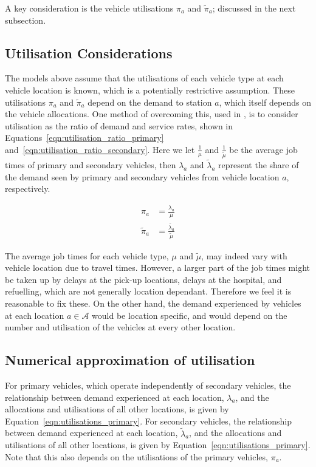 \documentclass[preprint,12pt]{elsarticle}
\begin{document}
A key consideration is the vehicle utilisations $\pi_a$ and $\tilde{\pi}_a$;
discussed in the next subsection.

\subsection{Utilisation Considerations}\label{sec:utilisation}
The models above assume that the utilisations of each vehicle type at each
vehicle location is known, which is a potentially restrictive assumption.
These utilisations $\pi_a$ and $\tilde{\pi}_a$ depend on the demand to station
$a$, which itself depends on the vehicle allocations. One method of overcoming
this, used in \cite{Knight2012918}, is to consider utilisation as the ratio of
demand and service rates, shown in Equations~\ref{eqn:utilisation_ratio_primary}
and~\ref{eqn:utilisation_ratio_secondary}. Here we let $\frac{1}{\mu}$ and
$\frac{1}{\tilde{\mu}}$ be the average job times of primary and secondary
vehicles, then $\lambda_a$ and $\tilde{\lambda}_a$ represent the share of the
demand seen by primary and secondary vehicles from vehicle location $a$,
respectively.

\begin{align}
\pi_a &= \frac{\lambda_a}{\mu} \label{eqn:utilisation_ratio_primary}\\
\tilde{\pi}_a &= \frac{\tilde{\lambda_a}}{\tilde{\mu}} \label{eqn:utilisation_ratio_secondary}
\end{align}

The average job times for each vehicle type, $\mu$ and $\tilde{\mu}$, may
indeed vary with vehicle location due to travel times. However, a larger part
of the job times might be taken up by delays at the pick-up locations, delays
at the hospital, and refuelling, which are not generally location dependant.
Therefore we feel it is reasonable to fix these.
On the other hand, the demand experienced by vehicles at each location
$a \in \mathcal{A}$ would be location specific, and would depend on the number
and utilisation of the vehicles at every other location. 

\subsection{Numerical approximation of utilisation}

For primary vehicles,
which operate independently of secondary vehicles, the relationship between
demand experienced at each location, $\lambda_a$, and the allocations and
utilisations of all other locations, is given by
Equation~\ref{eqn:utilisations_primary}. For secondary vehicles, the
relationship between demand experienced at each location, $\tilde{\lambda}_a$,
and the allocations and utilisations of all other locations, is given by
Equation~\ref{eqn:utilisations_primary}. Note that this also depends on the
utilisations of the primary vehicles, $\pi_a$.
\end{document}
